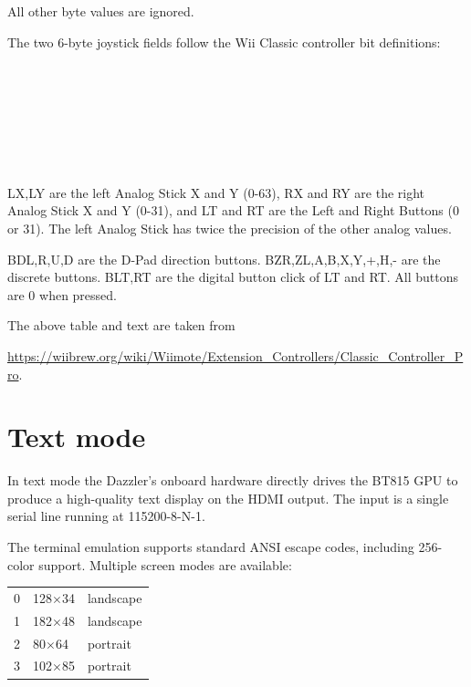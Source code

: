 \documentclass{article}
\newcommand{\gap}{\vspace{10pt}}
\begin{document}
All other byte values are ignored.

The two 6-byte joystick fields follow the Wii Classic controller bit definitions:

\gap
\begin{bytefield}[endianness=big,bitwidth=3.2em]{10}
  \\
  \\
   \\
  \\
\\
\\
\end{bytefield}

LX,LY are the left Analog Stick X and Y (0-63), RX and RY are the right Analog Stick X and Y (0-31), and LT and RT are the Left and Right Buttons (0 or 31). The left Analog Stick has twice the precision of the other analog values.

BD{L,R,U,D} are the D-Pad direction buttons. B{ZR,ZL,A,B,X,Y,+,H,-} are the discrete buttons. B{LT,RT} are the digital button click of LT and RT. All buttons are 0 when pressed.

The above table and text are taken from

\url{https://wiibrew.org/wiki/Wiimote/Extension_Controllers/Classic_Controller_Pro}.

\newpage
\section{Text mode}\label{sec:textmode}

In text mode the Dazzler's onboard hardware directly drives the BT815 GPU 
to produce a high-quality text display on the HDMI output.
The input is a single serial line running at 115200-8-N-1.

The terminal emulation supports standard ANSI escape codes, including 256-color support.
Multiple screen modes are available:

\begin{tabular}{cll}
0 & 128$\times$34 & landscape \\
1 & 182$\times$48 & landscape \\
2 & 80$\times$64  & portrait  \\
3 & 102$\times$85 & portrait  \\
\end{tabular}
\end{document}
